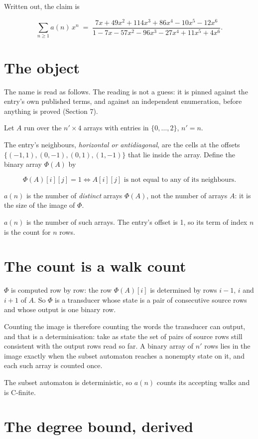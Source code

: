 \documentclass[11pt]{article}
\theoremstyle{definition}
\begin{document}
Written out, the claim is

\[\sum_{n \ge 1} a(n)\,x^n \;=\; \frac{7x + 49x^{2} + 114x^{3} + 86x^{4} - 10x^{5} - 12x^{6}}{1 - 7x - 57x^{2} - 96x^{3} - 27x^{4} + 11x^{5} + 4x^{6}}.\]

\section{The object}

The name is read as follows. The reading is not a guess: it is pinned against the entry's own published terms, and against an independent enumeration, before anything is proved (Section 7).

Let $A$ run over the $n' \times 4$ arrays with entries in $\{0,\dots,2\}$, $n' = n$.

The entry's neighbours, {\itshape horizontal or antidiagonal}, are the cells at the offsets $\{(-1,1), (0,-1), (0,1), (1,-1)\}$ that lie inside the array. Define the binary array $\Phi(A)$ by

\[\Phi(A)[i][j] = 1 \iff A[i][j] \text{ is not equal to any of its neighbours}.\]

$a(n)$ is the number of {\itshape distinct} arrays $\Phi(A)$, not the number of arrays $A$: it is the size of the image of $\Phi$.

$a(n)$ is the number of such arrays. The entry's offset is 1, so its term of index $n$ is the count for $n$ rows.

\section{The count is a walk count}

$\Phi$ is computed row by row: the row $\Phi(A)[i]$ is determined by rows $i-1$, $i$ and $i+1$ of $A$. So $\Phi$ is a transducer whose state is a pair of consecutive source rows and whose output is one binary row.

Counting the image is therefore counting the words the transducer can output, and that is a determinisation: take as state the set of pairs of source rows still consistent with the output rows read so far. A binary array of $n'$ rows lies in the image exactly when the subset automaton reaches a nonempty state on it, and each such array is counted once.

The subset automaton is deterministic, so $a(n)$ counts its accepting walks and is C-finite.

\section{The degree bound, derived}
\end{document}
